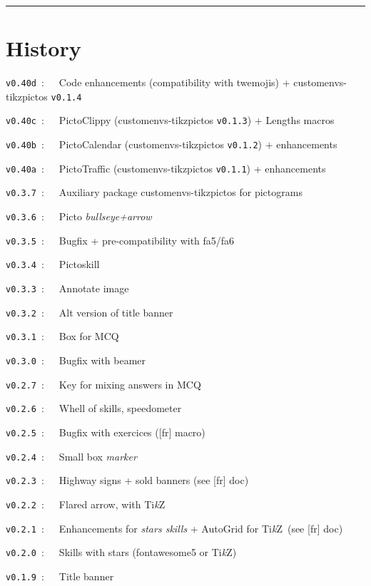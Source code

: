\documentclass[english,11pt,a4paper]{article}
\providecommand\tikzlogo{Ti\textit{k}Z}
\let\TikZ\tikzlogo
\begin{document}
\tableofcontents

\vspace*{5mm}

\hrule

\vfill

\section{History}

\verb|v0.40d|~:~~~Code enhancements (compatibility  with twemojis) + \textsf{customenvs-tikzpictos} \texttt{v0.1.4}

\verb|v0.40c|~:~~~PictoClippy (\textsf{customenvs-tikzpictos} \texttt{v0.1.3}) + Lengths macros

\verb|v0.40b|~:~~~PictoCalendar (\textsf{customenvs-tikzpictos} \texttt{v0.1.2}) + enhancements

\verb|v0.40a|~:~~~PictoTraffic (\textsf{customenvs-tikzpictos} \texttt{v0.1.1}) + enhancements

\verb|v0.3.7|~:~~~Auxiliary package \textsf{customenvs-tikzpictos} for pictograms

\verb|v0.3.6|~:~~~Picto \textit{bullseye+arrow}

\verb|v0.3.5|~:~~~Bugfix + pre-compatibility with \textsf{fa5/fa6}

\verb|v0.3.4|~:~~~Pictoskill

\verb|v0.3.3|~:~~~Annotate image

\verb|v0.3.2|~:~~~Alt version of title banner

\verb|v0.3.1|~:~~~Box for MCQ

\verb|v0.3.0|~:~~~Bugfix with \textsf{beamer}

\verb|v0.2.7|~:~~~Key for mixing answers in MCQ

\verb|v0.2.6|~:~~~Whell of skills, speedometer

\verb|v0.2.5|~:~~~Bugfix with exercices (\textsf{[fr]} macro)

\verb|v0.2.4|~:~~~Small box \textit{marker}

\verb|v0.2.3|~:~~~Highway signs + sold banners (see \textsf{[fr]} doc)

\verb|v0.2.2|~:~~~Flared arrow, with \TikZ

\verb|v0.2.1|~:~~~Enhancements for \textit{stars skills} + AutoGrid for \TikZ\ (see \textsf{[fr]} doc)

\verb|v0.2.0|~:~~~Skills with stars (\textsf{fontawesome5} or \TikZ)

\verb|v0.1.9|~:~~~Title banner
\end{document}

